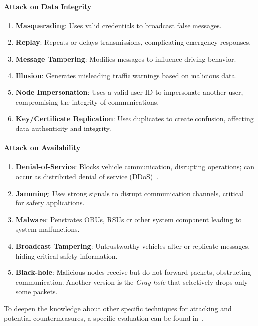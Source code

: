 \paragraph{Attack on Data Integrity}
\begin{enumerate}
    \item \textbf{Masquerading}: Uses valid credentials to broadcast false messages.
    \item \textbf{Replay}: Repeats or delays transmissions, complicating emergency responses.
    \item \textbf{Message Tampering}: Modifies messages to influence driving behavior.
    \item \textbf{Illusion}: Generates misleading traffic warnings based on malicious data.
    \item \textbf{Node Impersonation}: Uses a valid user ID to impersonate another user, compromising the integrity of communications.
    \item \textbf{Key/Certificate Replication}: Uses duplicates to create confusion, affecting data authenticity and integrity.
\end{enumerate}

\paragraph{Attack on Availability}
\begin{enumerate}
    \item \textbf{Denial-of-Service}: Blocks vehicle communication, disrupting operations; can occur as distributed denial of service (DDoS)~\cite{sontakke2022impact}.
    \item \textbf{Jamming}: Uses strong signals to disrupt communication channels, critical for safety applications.
    \item \textbf{Malware}: Penetrates OBUs, RSUs or other system component leading to system malfunctions.
    \item \textbf{Broadcast Tampering}: Untrustworthy vehicles alter or replicate messages, hiding critical safety information.
    \item \textbf{Black-hole}: Malicious nodes receive but do not forward packets, obstructing communication.
    Another version is the \textit{Gray-hole} that selectively drops only some packets.
\end{enumerate}


To deepen the knowledge about other specific techniques for attacking and potential countermeasures, a specific evaluation
can be found in~\cite{simulation-attacks-vanets, sheikh2019comprehensive, macena2023cybersecurity}.

